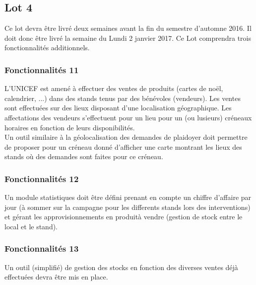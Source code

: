 \subsection{Lot 4}
Ce lot devra être livré deux semaines avant la fin du semestre d'automne 2016.  Il doit donc être livré la semaine du Lundi 2 janvier 2017. Ce Lot comprendra trois fonctionnalités additionnels.
\\

\subsubsection{Fonctionnalités 11}
L'UNICEF est amené à effectuer des ventes de produits (cartes de noël, calendrier, ...) dans des stands tenus par des bénévoles (vendeurs). Les ventes sont effectuées sur des lieux disposant d'une localisation géographique. Les affectations des vendeurs s'effectuent pour un lieu pour un (ou lusieurs) créneaux horaires en fonction de leurs disponibilités.
\\
Un outil similaire à la géolocalisation des demandes de plaidoyer doit permettre de proposer pour un créneau donné d'afficher une carte montrant les lieux des stands où des demandes sont faites pour ce créneau.
\\

\subsubsection{Fonctionnalités 12}
Un module statistiques doit être défini prenant en compte un chiffre d'affaire par jour (à sommer sur la campagne pour les differents stands lors des interventions) et gérant les approvisionnements en produità vendre (gestion de stock entre le local et le stand).
\\

\subsubsection{Fonctionnalités 13}
Un outil (simplifié) de gestion des stocks en fonction des diverses ventes déjà effectuées devra être mis en place.
\\
